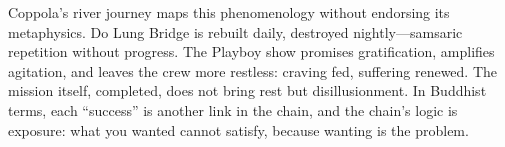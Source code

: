 Coppola's river journey maps this phenomenology without endorsing its metaphysics. Do Lung
Bridge is rebuilt daily, destroyed nightly---samsaric repetition without progress. The Playboy
show promises gratification, amplifies agitation, and leaves the crew more restless: craving
fed, suffering renewed. The mission itself, completed, does not bring rest but disillusionment.
In Buddhist terms, each ``success'' is another link in the chain, and the chain's logic is
exposure: what you wanted cannot satisfy, because wanting is the problem.
